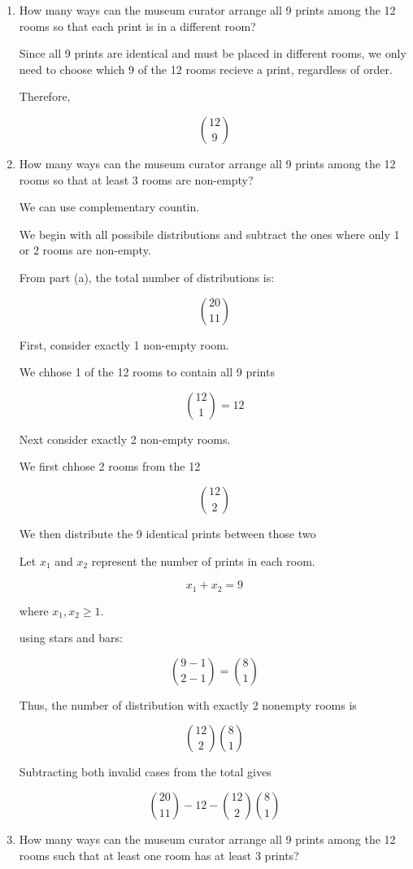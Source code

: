 \documentclass{article}
\begin{document}
\begin{enumerate}
\begin{enumerate}
\[
\boxed{
\binom{20}{11}
}
\]


\item How many ways can the museum curator arrange all 9 prints among the 12 rooms so that each
print is in a different room?

Since all 9 prints are identical and must be placed in different rooms, we only need to choose which 9 of the 
12 rooms recieve a print, regardless of order.

Therefore,

\[
\boxed{
\binom{12}{9}
}
\]


\item How many ways can the museum curator arrange all 9 prints among the 12 rooms so that at least 3 rooms are non-empty?

We can  use complementary countin.

We begin with all possibile distributions and subtract the ones where only 1 or 2 rooms are non-empty.

From part (a), the total number of distributions is:

\[
\binom{20}{11}
\]

First, consider exactly 1 non-empty room.

We chhose 1 of the 12 rooms to contain all 9 prints

\[
\binom{12}{1} =12
\]

Next consider exactly 2 non-empty rooms.

We first chhose 2 rooms from the 12

\[
\binom{12}{2}
\]

We then distribute the 9 identical prints between those two 

Let $x_1$ and $x_2$ represent the number of prints in each room.

\[
x_1 + x_2 = 9 
\]

where $x_1, x_2 \geq 1$.

using stars and bars:

\[
\binom{9-1}{2-1}
= 
\binom{8}{1} 
\]

Thus, the number of distribution with exactly 2 nonempty rooms is 

\[
\binom{12}{2}\binom{8}{1}
\]

Subtracting both invalid cases from the total gives

\[
\boxed{
\binom{20}{11}
-
12
-
\binom{12}{2}\binom{8}{1}
}
\]

\item How many ways can the museum curator arrange all 9 prints among the 12 rooms such that at least one room has at least 3 prints?


\end{enumerate}
\end{enumerate}
\end{document}

